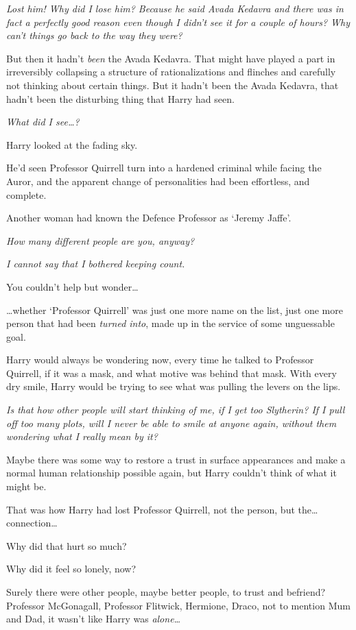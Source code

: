 \emph{Lost him! Why did I lose him? Because he said Avada Kedavra and there was in fact a perfectly good reason even though I didn’t see it for a couple of hours? Why can’t things go back to the way they were?}

But then it hadn’t \emph{been} the Avada Kedavra. That might have played a part in irreversibly collapsing a structure of rationalizations and flinches and carefully not thinking about certain things. But it hadn’t been the Avada Kedavra, that hadn’t been the disturbing thing that Harry had seen.

\emph{What did I see…?}

Harry looked at the fading sky.

He’d seen Professor Quirrell turn into a hardened criminal while facing the Auror, and the apparent change of personalities had been effortless, and complete.

Another woman had known the Defence Professor as ‘Jeremy Jaffe’.

\emph{How many different people are you, anyway?}

\emph{I cannot say that I bothered keeping count.}

You couldn’t help but wonder…

…whether ‘Professor Quirrell’ was just one more name on the list, just one more person that had been \emph{turned into}, made up in the service of some unguessable goal.

Harry would always be wondering now, every time he talked to Professor Quirrell, if it was a mask, and what motive was behind that mask. With every dry smile, Harry would be trying to see what was pulling the levers on the lips.

\emph{Is that how other people will start thinking of me, if I get too Slytherin? If I pull off too many plots, will I never be able to smile at anyone again, without them wondering what I really mean by it?}

Maybe there was some way to restore a trust in surface appearances and make a normal human relationship possible again, but Harry couldn’t think of what it might be.

That was how Harry had lost Professor Quirrell, not the person, but the…connection…

Why did that hurt so much?

Why did it feel so lonely, now?

Surely there were other people, maybe better people, to trust and befriend? Professor McGonagall, Professor Flitwick, Hermione, Draco, not to mention Mum and Dad, it wasn’t like Harry was \emph{alone…}

